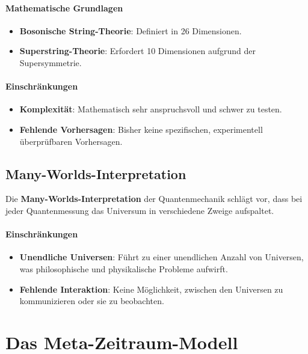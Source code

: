 \documentclass[11pt,a4paper]{article}
\begin{document}
\paragraph{Mathematische Grundlagen}

\begin{itemize}
    \item \textbf{Bosonische String-Theorie}: Definiert in 26 Dimensionen.
    \item \textbf{Superstring-Theorie}: Erfordert 10 Dimensionen aufgrund der Supersymmetrie.
\end{itemize}

\paragraph{Einschränkungen}

\begin{itemize}
    \item \textbf{Komplexität}: Mathematisch sehr anspruchsvoll und schwer zu testen.
    \item \textbf{Fehlende Vorhersagen}: Bisher keine spezifischen, experimentell überprüfbaren Vorhersagen.
\end{itemize}

\subsection{Many-Worlds-Interpretation}

Die \textbf{Many-Worlds-Interpretation} der Quantenmechanik schlägt vor, dass bei jeder Quantenmessung das Universum in verschiedene Zweige aufspaltet.

\paragraph{Einschränkungen}

\begin{itemize}
    \item \textbf{Unendliche Universen}: Führt zu einer unendlichen Anzahl von Universen, was philosophische und physikalische Probleme aufwirft.
    \item \textbf{Fehlende Interaktion}: Keine Möglichkeit, zwischen den Universen zu kommunizieren oder sie zu beobachten.
\end{itemize}

\section{Das Meta-Zeitraum-Modell}
\end{document}
